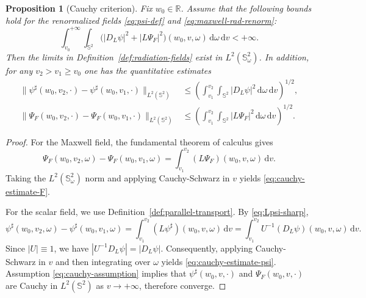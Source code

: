 \documentclass[11pt]{article}
\numberwithin{equation}{section}
\theoremstyle{plain}
\newtheorem{proposition}[theorem]{Proposition}
\theoremstyle{definition}
\theoremstyle{remark}
\newcommand{\dd}{\mathrm{d}}
\begin{document}
\begin{proposition}[Cauchy criterion]\label{prop:cauchy-criterion}
Fix $w_0\in\mathbb{R}$.
Assume that the following bounds hold for the renormalized fields \eqref{eq:psi-def} and \eqref{eq:maxwell-rad-renorm}:
\begin{equation}\label{eq:cauchy-assumption}
\int_{v_0}^{+\infty}\!\!\int_{\mathbb{S}^2}
\bigl(|D_L\psi|^2 + |L\Psi_F|^2\bigr)(w_0,v,\omega)\,\dd\omega\,\dd v <+\infty.
\end{equation}
Then the limits in Definition~\ref{def:radiation-fields} exist in $L^2(\mathbb{S}^2_\omega)$.
In addition, for any $v_2>v_1\ge v_0$ one has the quantitative estimates
\begin{eqnarray}
\|\psi^\sharp(w_0,v_2,\cdot)-\psi^\sharp(w_0,v_1,\cdot)\|_{L^2(\mathbb{S}^2)}
&\le
\left(\int_{v_1}^{v_2}\!\!\int_{\mathbb{S}^2}|D_L\psi|^2\,\dd\omega\,\dd v\right)^{1/2},
\label{eq:cauchy-estimate-psi}
\\
\|\Psi_F(w_0,v_2,\cdot)-\Psi_F(w_0,v_1,\cdot)\|_{L^2(\mathbb{S}^2)}
&\le
\left(\int_{v_1}^{v_2}\!\!\int_{\mathbb{S}^2}|L\Psi_F|^2\,\dd\omega\,\dd v\right)^{1/2}.
\label{eq:cauchy-estimate-F}
\end{eqnarray}
\end{proposition}

\begin{proof}
For the Maxwell field, the fundamental theorem of calculus gives
\begin{equation}
\Psi_F(w_0,v_2,\omega)-\Psi_F(w_0,v_1,\omega)=\int_{v_1}^{v_2} (L\Psi_F)(w_0,v,\omega)\,\dd v.
\end{equation}
Taking the $L^2(\mathbb{S}^2_\omega)$ norm and applying Cauchy-Schwarz in $v$ yields \eqref{eq:cauchy-estimate-F}.

For the scalar field, we use Definition~\ref{def:parallel-transport}. By \eqref{eq:Lpsi-sharp},
\begin{equation}
\psi^\sharp(w_0,v_2,\omega)-\psi^\sharp(w_0,v_1,\omega)=\int_{v_1}^{v_2} (L\psi^\sharp)(w_0,v,\omega)\,\dd v
=\int_{v_1}^{v_2} U^{-1}(D_L\psi)(w_0,v,\omega)\,\dd v.
\end{equation}
Since $|U|\equiv 1$, we have $|U^{-1}D_L\psi|=|D_L\psi|$. Consequently, applying Cauchy-Schwarz in $v$ and then integrating over $\omega$ yields \eqref{eq:cauchy-estimate-psi}.
Assumption \eqref{eq:cauchy-assumption} implies that $\psi^\sharp(w_0,v,\cdot)$ and $\Psi_F(w_0,v,\cdot)$ are Cauchy in $L^2(\mathbb{S}^2)$ as $v\to+\infty$, therefore converge.
\end{proof}
\end{document}
